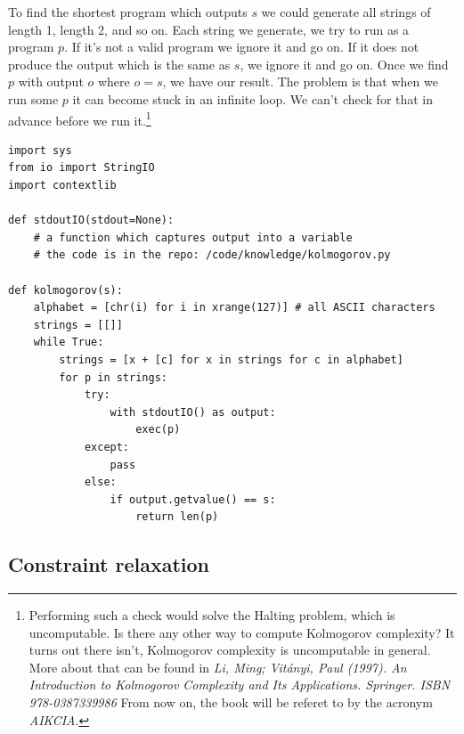To find the shortest program which outputs $s$ we could generate all strings of length 1, length 2, and so on.
Each string we generate, we try to run as a program $p$.
If it's not a valid program we ignore it and go on.
If it does not produce the output which is the same as $s$, we ignore it and go on.
Once we find $p$ with output $o$ where $o = s$, we have our result.
The problem is that when we run some $p$ it can become stuck in an infinite loop.
We can't check for that in advance before we run it.\footnote{
Performing such a check would solve the Halting problem, which is uncomputable.
Is there any other way to compute Kolmogorov complexity?
It turns out there isn't, Kolmogorov complexity is uncomputable in general.
More about that can be found in \textit{Li, Ming; Vitányi, Paul (1997). An Introduction to Kolmogorov Complexity and Its Applications. Springer. ISBN 978-0387339986}
From now on, the book will be referet to by the acronym \textit{AIKCIA}.
}

\newpage

\begin{lstlisting}[caption={Computing the Kolmogorov complexity of a string. Do not run this at home.}]
import sys
from io import StringIO
import contextlib

def stdoutIO(stdout=None):
	# a function which captures output into a variable
	# the code is in the repo: /code/knowledge/kolmogorov.py

def kolmogorov(s):
	alphabet = [chr(i) for i in xrange(127)] # all ASCII characters
	strings = [[]]
	while True:
		strings = [x + [c] for x in strings for c in alphabet]
		for p in strings:
			try:
				with stdoutIO() as output:
					exec(p)
			except:
				pass
			else:
				if output.getvalue() == s:
					return len(p)
\end{lstlisting}

\newpage

\subsection{Constraint relaxation}

